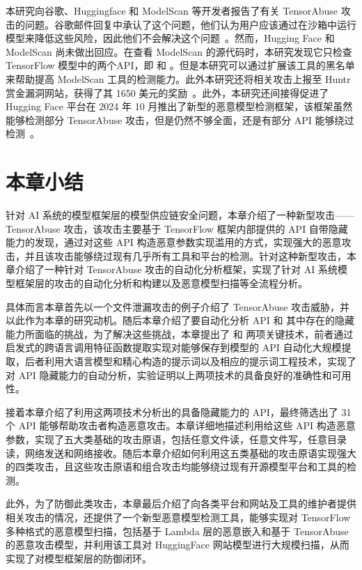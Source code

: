 本研究向谷歌、Huggingface 和 ModelScan 等开发者报告了有关 TensorAbuse 攻击的问题。谷歌邮件回复中承认了这个问题，他们认为用户应该通过在沙箱中运行模型来降低这些风险，因此他们不会解决这个问题~\cite{google_code_sandboxing}。然而，Hugging Face 和 ModelScan 尚未做出回应。在查看 ModelScan 的源代码时，本研究发现它只检查 TensorFlow 模型中的两个API，即  和 。但是本研究可以通过扩展该工具的黑名单来帮助提高 ModelScan 工具的检测能力。此外本研究还将相关攻击上报至 Huntr 赏金漏洞网站，获得了其 1650 美元的奖励~\cite{huntr_platform}。此外，本研究还间接得促进了 Hugging Face 平台在 2024 年 10 月推出了新型的恶意模型检测框架，该框架虽然能够检测部分 TensorAbuse 攻击，但是仍然不够全面，还是有部分 API 能够绕过检测~\cite{huggingface_protectai_2026}。

\section{本章小结}
针对 AI 系统的模型框架层的模型供应链安全问题，本章介绍了一种新型攻击—— TensorAbuse 攻击，该攻击主要基于 TensorFlow 框架内部提供的 API 自带隐藏能力的发现，通过对这些 API 构造恶意参数实现滥用的方式，实现强大的恶意攻击，并且该攻击能够绕过现有几乎所有工具和平台的检测。针对这种新型攻击，本章介绍了一种针对 TensorAbuse 攻击的自动化分析框架，实现了针对 AI 系统模型框架层的攻击的自动化分析和构建以及恶意模型扫描等全流程分析。

具体而言本章首先以一个文件泄漏攻击的例子介绍了 TensorAbuse 攻击威胁，并以此作为本章的研究动机。随后本章介绍了要自动化分析 API 和 其中存在的隐藏能力所面临的挑战，为了解决这些挑战，本章提出了  和  两项关键技术，前者通过启发式的跨语言调用特征函数提取实现对能够保存到模型的 API 自动化大规模提取，后者利用大语言模型和精心构造的提示词以及相应的提示词工程技术，实现了对 API 隐藏能力的自动分析，实验证明以上两项技术的具备良好的准确性和可用性。

接着本章介绍了利用这两项技术分析出的具备隐藏能力的 API，最终筛选出了 31 个 API 能够帮助攻击者构造恶意攻击。本章详细地描述利用给这些 API 构造恶意参数，实现了五大类基础的攻击原语，包括任意文件读，任意文件写，任意目录读，网络发送和网络接收。随后本章介绍如何利用这五类基础的攻击原语实现强大的四类攻击，且这些攻击原语和组合攻击均能够绕过现有开源模型平台和工具的检测。

此外，为了防御此类攻击，本章最后介绍了向各类平台和网站及工具的维护者提供相关攻击的情况，还提供了一个新型恶意模型检测工具，能够实现对 TensorFlow 多种格式的恶意模型扫描，包括基于 Lambda 层的恶意嵌入和基于 TensorAbuse 的恶意攻击模型，并利用该工具对 HuggingFace 网站模型进行大规模扫描，从而实现了对模型框架层的防御闭环。